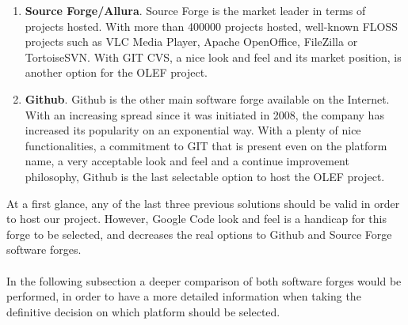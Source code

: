 \documentclass[11pt]{article}
\begin{document}
\begin{enumerate}
\item{\textbf{Source Forge/Allura}}. Source Forge is the market leader in terms of projects hosted. With more than 400000 projects hosted, well-known FLOSS projects such as VLC Media Player, Apache OpenOffice, FileZilla or TortoiseSVN. With GIT CVS, a nice look and feel and its market position, is another option for the OLEF project.
\item{\textbf{Github}}. Github is the other main software forge available on the Internet. With an increasing spread since it was initiated in 2008, the company has increased its popularity on an exponential way. With a plenty of nice functionalities, a commitment to GIT that is present even on the platform name, a very acceptable look and feel and a continue improvement philosophy, Github is the last selectable option to host the OLEF project.
\end{enumerate}
At a first glance, any of the last three previous solutions should be valid in order to host our project. However, Google Code look and feel is a handicap for this forge to be selected, and decreases the real options to Github and Source Forge software forges.\\
\\
In the following subsection a deeper comparison of both software forges would be performed, in order to have a more detailed information when taking the definitive decision on which platform should be selected.
\end{document}
